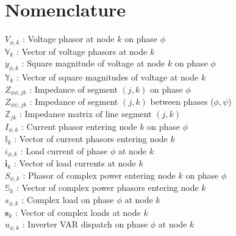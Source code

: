 \section*{Nomenclature}

\noindent $V_{\phi,k}$ : Voltage phasor at node $k$ on phase $\phi$ \\
\noindent $\mathbb{V}_{k}$ : Vector of voltage phasors at node $k$ \\
\noindent $y_{\phi,k}$ : Square magnitude of voltage at node $k$ on phase $\phi$ \\ %
\noindent $\mathbb{Y}_{k}$ : Vector of square magnitudes of voltage at node $k$ \\
\noindent $Z_{\phi \phi,jk}$ : Impedance of segment $(j,k)$ on phase $\phi$ \\
\noindent $Z_{\phi \psi,jk}$ : Impedance of segment $(j,k)$ between phases ($\phi,\psi$) \\
\noindent $\mathbb{Z}_{jk}$ : Impedance matrix of line segment $(j,k)$ \\
\noindent $I_{\phi,k}$ : Current phasor entering node $k$ on phase $\phi$ \\
\noindent $\mathbb{I}_{k}$ : Vector of current phasors entering node $k$ \\
\noindent $i_{\phi,k}$ : Load current of phase $\phi$ at node $k$ \\
\noindent $\mathbf{i}_{k}$ : Vector of load currents at node $k$ \\
\noindent $S_{\phi,k}$ : Phasor of complex power entering node $k$ on phase $\phi$ \\
\noindent $\mathbb{S}_{k}$ : Vector of complex power phasors entering node $k$ \\
\noindent $s_{\phi,k}$ : Complex load on phase $\phi$ at node $k$ \\
\noindent $\mathbf{s}_{k}$ : Vector of complex loads at node $k$ \\
\noindent $u_{\phi,k}$ : Inverter VAR dispatch on phase $\phi$ at node $k$